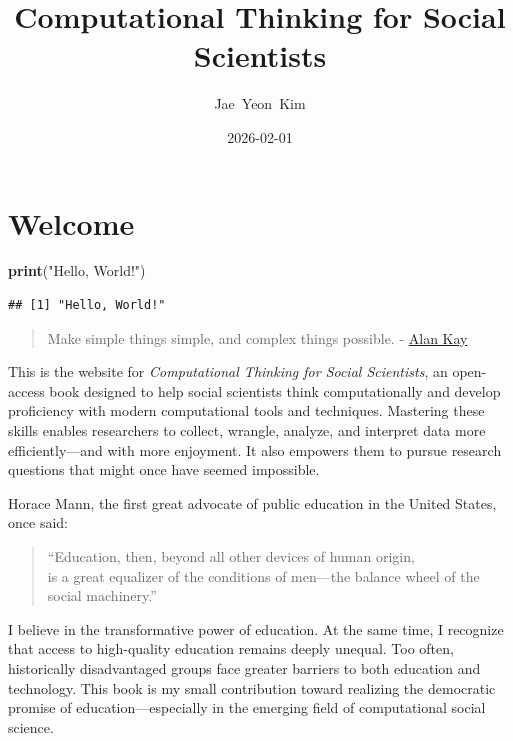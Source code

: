 \documentclass[
]{book}
\title{Computational Thinking for Social Scientists}
\author{Jae~Yeon~Kim}
\date{2026-02-01}
\newenvironment{Shaded}{\begin{snugshade}}{\end{snugshade}}
\newcommand{\FunctionTok}[1]{\textcolor[rgb]{0.13,0.29,0.53}{\textbf{#1}}}
\newcommand{\NormalTok}[1]{#1}
\newcommand{\StringTok}[1]{\textcolor[rgb]{0.31,0.60,0.02}{#1}}
\begin{document}
\maketitle

{
\setcounter{tocdepth}{1}
\tableofcontents
}
\chapter{Welcome}\label{welcome}

\begin{Shaded}
\begin{Highlighting}[]
\FunctionTok{print}\NormalTok{(}\StringTok{"Hello, World!"}\NormalTok{)}
\end{Highlighting}
\end{Shaded}

\begin{verbatim}
## [1] "Hello, World!"
\end{verbatim}

\begin{quote}
Make simple things simple, and complex things possible. - \href{https://www.quora.com/What-is-the-story-behind-Alan-Kay-s-adage-Simple-things-should-be-simple-complex-things-should-be-possible}{Alan Kay}
\end{quote}

This is the website for \emph{Computational Thinking for Social Scientists}, an open-access book designed to help social scientists think computationally and develop proficiency with modern computational tools and techniques. Mastering these skills enables researchers to collect, wrangle, analyze, and interpret data more efficiently---and with more enjoyment. It also empowers them to pursue research questions that might once have seemed impossible.

Horace Mann, the first great advocate of public education in the United States, once said:

\begin{quote}
``Education, then, beyond all other devices of human origin,\\
is a great equalizer of the conditions of men---the balance wheel of the social machinery.''
\end{quote}

I believe in the transformative power of education. At the same time, I recognize that access to high-quality education remains deeply unequal. Too often, historically disadvantaged groups face greater barriers to both education and technology. This book is my small contribution toward realizing the democratic promise of education---especially in the emerging field of computational social science.
\end{document}
